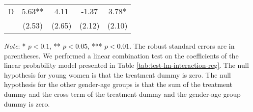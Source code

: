 \documentclass[12pt, a4paper]{article}
\begin{document}
\begin{table}[H]
\begin{threeparttable}
\begin{tabular}[t]{lcccc}
\hspace{1em}D & 5.63** & 4.11 & -1.37 & 3.78*\\
\hspace{1em} & (2.53) & (2.65) & (2.12) & (2.10)\\
\bottomrule
\end{tabular}
\begin{tablenotes}
\item \emph{Note}: * $p < 0.1$, ** $p < 0.05$, *** $p < 0.01$. The robust standard errors are in parentheses. We performed a linear combination test on the coefficients of the linear probability model presented in Table \ref{tab:test-lm-interaction-reg}. The null hypothesis for young women is that the treatment dummy is zero. The null hypothesis for the other gender-age groups is that the sum of the treatment dummy and the cross term of the treatment dummy and the gender-age group dummy is zero.
\end{tablenotes}
\end{threeparttable}
\end{table}
\end{document}
